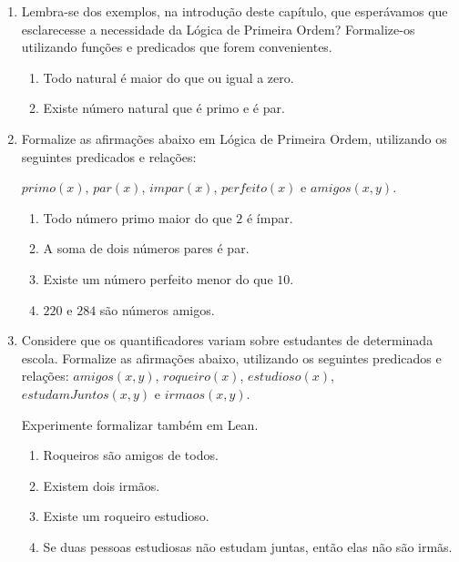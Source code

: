         \begin{enumerate}
            \item Lembra-se dos exemplos, na introdução deste capítulo, que esperávamos que esclarecesse a necessidade da Lógica de Primeira Ordem?
            Formalize-os utilizando funções e predicados que forem convenientes.
            
            \begin{enumerate}
                \item Todo natural é maior do que ou igual a zero.
                \item Existe número natural que é primo e é par.
            \end{enumerate}
    
            \item Formalize as afirmações abaixo em Lógica de Primeira Ordem, utilizando os seguintes predicados e relações:
    
            $primo(x)$, $par(x)$, $impar(x)$, $perfeito(x)$ e $amigos(x, y)$.
    
            \begin{enumerate}
                \item Todo número primo maior do que $2$ é ímpar.
                \item A soma de dois números pares é par.
                \item Existe um número perfeito menor do que $10$.
                \item $220$ e $284$ são números amigos.
            \end{enumerate}
    
            \item Considere que os quantificadores variam sobre estudantes de determinada escola. Formalize as afirmações abaixo, utilizando os seguintes predicados e relações:
            $amigos(x, y)$, $roqueiro(x)$, $estudioso(x)$, $estudamJuntos(x, y)$ e $irmaos(x, y)$.
            
            Experimente formalizar também em Lean.
            \begin{enumerate}
                \item Roqueiros são amigos de todos.
                \item Existem dois irmãos.
                \item Existe um roqueiro estudioso.
                \item Se duas pessoas estudiosas não estudam juntas, então elas não são irmãs.
            \end{enumerate}
        \end{enumerate}
    
